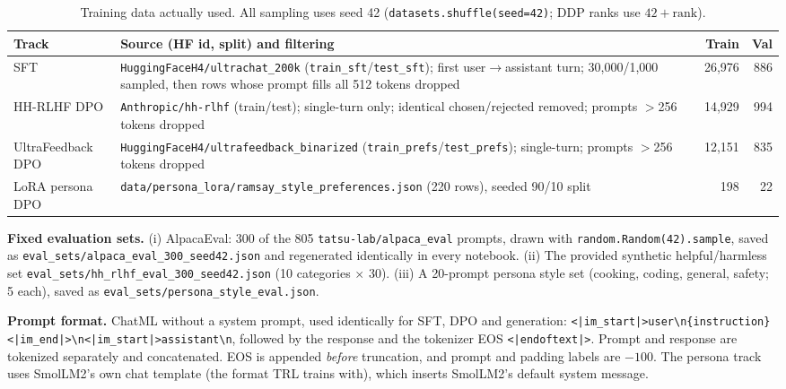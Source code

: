 \documentclass[10pt,a4paper]{article}
\begin{document}
\begin{table}[h]
\centering\small
\begin{tabularx}{\linewidth}{@{}lXrr@{}}
\toprule
Track & Source (HF id, split) and filtering & Train & Val \\
\midrule
SFT & \texttt{HuggingFaceH4/ultrachat\_200k} (\texttt{train\_sft}/\texttt{test\_sft}); first user$\to$assistant turn; 30{,}000/1{,}000 sampled, then rows whose prompt fills all 512 tokens dropped & 26{,}976 & 886 \\
HH-RLHF DPO & \texttt{Anthropic/hh-rlhf} (train/test); single-turn only; identical chosen/rejected removed; prompts $>$256 tokens dropped & 14{,}929 & 994 \\
UltraFeedback DPO & \texttt{HuggingFaceH4/ultrafeedback\_binarized} (\texttt{train\_prefs}/\texttt{test\_prefs}); single-turn; prompts $>$256 tokens dropped & 12{,}151 & 835 \\
LoRA persona DPO & \texttt{data/persona\_lora/ramsay\_style\_preferences.json} (220 rows), seeded 90/10 split & 198 & 22 \\
\bottomrule
\end{tabularx}
\caption{Training data actually used. All sampling uses seed 42 (\texttt{datasets.shuffle(seed=42)}; DDP ranks use $42+\text{rank}$).}
\label{tab:data}
\end{table}

\textbf{Fixed evaluation sets.} (i) AlpacaEval: 300 of the 805 \texttt{tatsu-lab/alpaca\_eval} prompts, drawn with \texttt{random.Random(42).sample}, saved as \texttt{eval\_sets/alpaca\_eval\_300\_seed42.json} and regenerated identically in every notebook. (ii) The provided synthetic helpful/harmless set \texttt{eval\_sets/hh\_rlhf\_eval\_300\_seed42.json} (10 categories $\times$ 30). (iii) A 20-prompt persona style set (cooking, coding, general, safety; 5 each), saved as \texttt{eval\_sets/persona\_style\_eval.json}.

\textbf{Prompt format.} ChatML without a system prompt, used identically for SFT, DPO and generation: \texttt{<|im\_start|>user\textbackslash n\{instruction\}<|im\_end|>\textbackslash n<|im\_start|>assistant\textbackslash n}, followed by the response and the tokenizer EOS \texttt{<|endoftext|>}. Prompt and response are tokenized separately and concatenated. EOS is appended \emph{before} truncation, and prompt and padding labels are $-100$. The persona track uses SmolLM2's own chat template (the format TRL trains with), which inserts SmolLM2's default system message.
\end{document}
